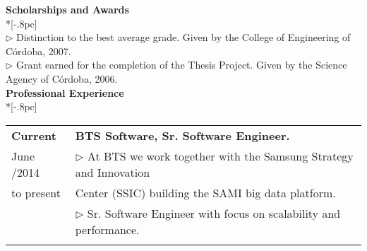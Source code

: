 \documentclass[letter,11pt,english]{article}
\begin{document}
{\bf Scholarships and Awards} \\*[-.8pc]
\underline{\hspace{6in}} \\
\renewcommand{\labelitemi}{}
$\triangleright$ Distinction to the best average grade.
Given by the College of Engineering of C\'ordoba, 2007.\\
$\triangleright$ Grant earned for the completion of the Thesis Project.
Given by the Science Agency of C\'ordoba, 2006.\\

\newpage
{\large \bf Professional Experience}\\*[-.8pc]
\underline{\hspace{6in}}
\\
\begin{tabular}{ p{2cm} l }
  {\bf Current} & {\bf BTS Software, Sr. Software Engineer.}\\
   June /2014   & $\triangleright$ At BTS we work together with the Samsung Strategy and Innovation\\
   to present   & Center (SSIC) building the SAMI big data platform.\\
                & $\triangleright$ Sr. Software Engineer with focus on scalability and performance.\\ 
\\
                

\end{tabular}
\end{document}
